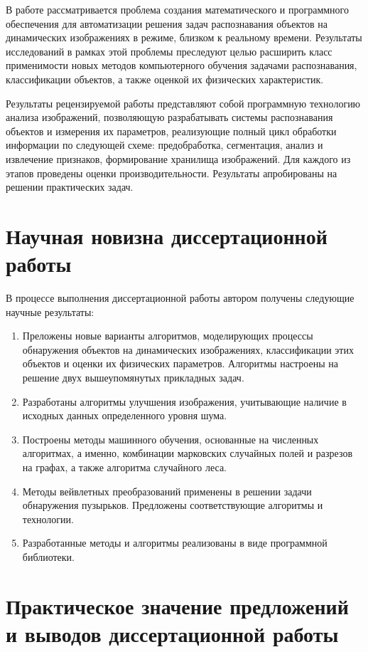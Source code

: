 \documentclass[12pt]{extarticle}
\begin{document}
В работе рассматривается проблема создания математического и программного обеспечения для автоматизации решения задач распознавания объектов на динамических изображениях в режиме, близком к реальному времени.  Результаты исследований в рамках этой проблемы преследуют целью расширить класс применимости новых методов компьютерного обучения задачами распознавания, классификации объектов, а также оценкой их физических характеристик.  %

Результаты рецензируемой работы представляют собой программную технологию анализа изображений, позволяющую разрабатывать системы распознавания объектов и измерения их параметров, реализующие полный цикл обработки информации по следующей схеме: предобработка, сегментация, анализ и извлечение признаков, формирование хранилища изображений.  Для каждого из этапов проведены оценки производительности.  Результаты апробированы на решении практических задач.

\section{Научная новизна диссертационной работы}
\label{sec:sci-new}

В процессе выполнения диссертационной работы автором получены следующие научные результаты:
\begin{enumerate}
\item Преложены новые варианты алгоритмов, моделирующих процессы обнаружения объектов на динамических изображениях, классификации этих объектов и оценки их физических параметров.  Алгоритмы настроены на решение двух вышеупомянутых прикладных задач.
\item Разработаны алгоритмы улучшения изображения, учитывающие наличие в исходных данных определенного уровня шума.
\item Построены методы машинного обучения, основанные на численных алгоритмах, а именно, комбинации марковских случайных полей и разрезов на графах, а также алгоритма случайного леса.
\item Методы вейвлетных преобразований применены в решении задачи обнаружения пузырьков. Предложены соответствующие алгоритмы и технологии.
\item Разработанные методы и алгоритмы реализованы в виде программной библиотеки.
\end{enumerate}

\section{Практическое значение предложений и выводов диссертационной работы}
\label{sec:prec-val}
\end{document}

